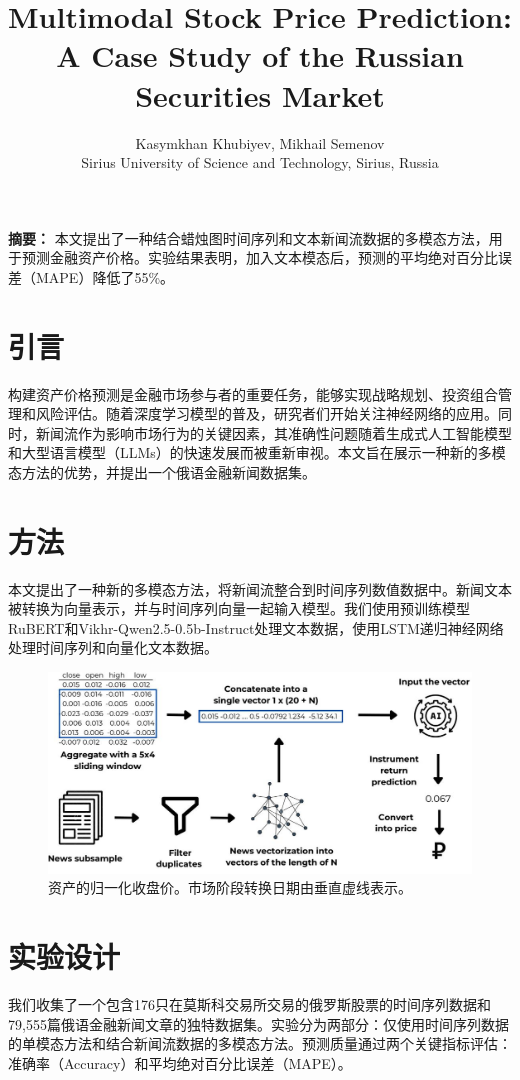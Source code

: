 \documentclass[10pt,twocolumn]{article}
\title{\textbf{Multimodal Stock Price Prediction: A Case Study of the Russian Securities Market}}
\author{
    Kasymkhan Khubiyev, Mikhail Semenov\\
    Sirius University of Science and Technology, Sirius, Russia
}
\begin{document}
\maketitle

\noindent \textbf{摘要：} 本文提出了一种结合蜡烛图时间序列和文本新闻流数据的多模态方法，用于预测金融资产价格。实验结果表明，加入文本模态后，预测的平均绝对百分比误差（MAPE）降低了55\%。

\vspace{0.5em}

\section{引言}
构建资产价格预测是金融市场参与者的重要任务，能够实现战略规划、投资组合管理和风险评估。随着深度学习模型的普及，研究者们开始关注神经网络的应用。同时，新闻流作为影响市场行为的关键因素，其准确性问题随着生成式人工智能模型和大型语言模型（LLMs）的快速发展而被重新审视。本文旨在展示一种新的多模态方法的优势，并提出一个俄语金融新闻数据集。

\section{方法}
本文提出了一种新的多模态方法，将新闻流整合到时间序列数值数据中。新闻文本被转换为向量表示，并与时间序列向量一起输入模型。我们使用预训练模型RuBERT和Vikhr-Qwen2.5-0.5b-Instruct处理文本数据，使用LSTM递归神经网络处理时间序列和向量化文本数据。

\begin{figure}[h]
    \centering
    \includegraphics[width=0.9\linewidth]{_page_6_Figure_2.jpeg}
    \caption{资产的归一化收盘价。市场阶段转换日期由垂直虚线表示。}
\end{figure}

\section{实验设计}
我们收集了一个包含176只在莫斯科交易所交易的俄罗斯股票的时间序列数据和79,555篇俄语金融新闻文章的独特数据集。实验分为两部分：仅使用时间序列数据的单模态方法和结合新闻流数据的多模态方法。预测质量通过两个关键指标评估：准确率（Accuracy）和平均绝对百分比误差（MAPE）。
\end{document}

